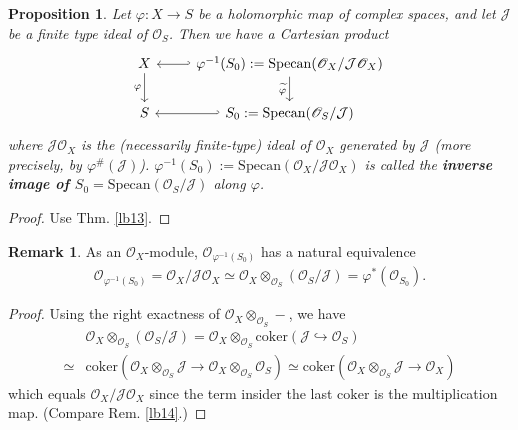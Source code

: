 \documentclass[12pt,b5paper,notitlepage]{report}
\theoremstyle{definition}
\newtheorem{rem}[df]{Remark}
\theoremstyle{plain}
\newtheorem{pp}[df]{Proposition}
\newcommand{\mc}{\mathcal}
\newcommand{\wtd}{\widetilde}
\newcommand{\scr}{\mathscr}
\newcommand{\coker}{\mathrm{coker}}
\newcommand{\Specan}{\mathrm{Specan}}
\numberwithin{equation}{section}
\begin{document}
\begin{pp}\label{lb39}
Let $\varphi:X\rightarrow S$ be a holomorphic map of complex spaces, and let $\mc J$ be a finite type ideal of $\scr O_S$. Then we have a Cartesian product
\begin{equation}
\begin{tikzcd}
X \arrow[d,"\varphi"'] & \varphi^{-1}(S_0):=\Specan(\scr O_X/\mc J\scr O_X) \arrow[d,"\wtd\varphi"'] \arrow[l, hook'] \\
S           & S_0:=\Specan(\scr O_S/\mc J) \arrow[l, hook']          
\end{tikzcd}
\end{equation}
where $\mc J\scr O_X$ is the (necessarily finite-type) ideal of $\scr O_X$ generated by $\mc J$ (more precisely, by $\varphi^\#(\mc J)$). $\varphi^{-1}(S_0):=\Specan(\scr O_X/\mc J\scr O_X)$ is called the \textbf{inverse image of $S_0=\Specan(\scr O_S/\mc J)$} along $\varphi$. 
\end{pp}



\begin{proof}
Use Thm. \ref{lb13}.
\end{proof}


\begin{rem}
As an $\scr O_X$-module, $\scr O_{\varphi^{-1}(S_0)}$ has a natural equivalence
\begin{align}
\scr O_{\varphi^{-1}(S_0)}=\scr O_X/\mc J\scr O_X\simeq \scr O_X\otimes_{\scr O_S}(\scr O_S/\mc J)=\varphi^*(\scr O_{S_0}).
\end{align}
\end{rem}
\begin{proof}
Using the right exactness of $\scr O_X\otimes_{\scr O_S}-$, we have
\begin{align*}
&\scr O_X\otimes_{\scr O_S}(\scr O_S/\mc J)=\scr O_X\otimes_{\scr O_S}\coker(\mc J\hookrightarrow\scr O_S)\\
\simeq &\coker (\scr O_X\otimes_{\scr O_S}\mc J\rightarrow \scr O_X\otimes_{\scr O_S}\scr O_S)\simeq \coker(\scr O_X\otimes_{\scr O_S}\mc J\rightarrow\scr O_X)
\end{align*}
which equals $\scr O_X/\mc J\scr O_X$ since the term insider the last $\coker$ is the multiplication map. (Compare Rem. \ref{lb14}.)
\end{proof}
\end{document}
